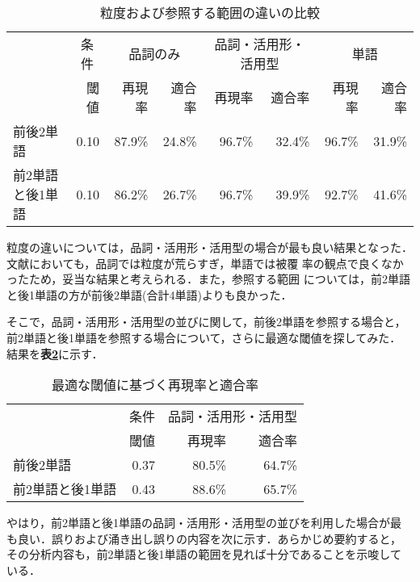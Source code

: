 \begin{table}
\caption{粒度および参照する範囲の違いの比較}\label{t:hikaku}
\begin{center}
\begin{tabular}{|l||r||r|r|r|r|r|r|}
\hline
 & \multicolumn{1}{c||}{条件} 
                 & \multicolumn{2}{c|}{品詞のみ}
                 & \multicolumn{2}{c|}{品詞・活用形・活用型}
                 & \multicolumn{2}{c|}{単語} \\
\cline{2-8}
                 & 閾値 & 再現率 & 適合率 & 再現率 & 適合率 & 再現率 & 適合率 \\
\hline\hline
前後2単語        & 0.10 & 87.9\% & 24.8\% & 96.7\% & 32.4\% & 96.7\% & 31.9\% \\
\hline
前2単語と後1単語 & 0.10 & 86.2\% & 26.7\% & 96.7\% & 39.9\% & 92.7\% & 41.6\% \\
\hline
\end{tabular}
\end{center}
\end{table}

粒度の違いについては，品詞・活用形・活用型の場合が最も良い結果となった．
文献\cite{Takezawa96}においても，品詞では粒度が荒らすぎ，単語では被覆
率の観点で良くなかったため，妥当な結果と考えられる．また，参照する範囲
については，前2単語と後1単語の方が前後2単語(合計4単語)よりも良かった．

そこで，品詞・活用形・活用型の並びに関して，前後2単語を参照する場合と，
前2単語と後1単語を参照する場合について，さらに最適な閾値を探してみた．
結果を{\bf\dg 表\ref{t:result}}に示す．

\begin{table}
\caption{最適な閾値に基づく再現率と適合率}\label{t:result}
\begin{center}
\begin{tabular}{|l||r||r|r|}
\hline
 & \multicolumn{1}{c||}{条件} & \multicolumn{2}{c|}{品詞・活用形・活用型} \\
\cline{2-4}
                 & 閾値 & 再現率 & 適合率 \\
\hline\hline
前後2単語        & 0.37 & 80.5\% & 64.7\% \\
\hline
前2単語と後1単語 & 0.43 & 88.6\% & 65.7\% \\
\hline
\end{tabular}
\end{center}
\end{table}

やはり，前2単語と後1単語の品詞・活用形・活用型の並びを利用した場合が最
も良い．誤りおよび涌き出し誤りの内容を次に示す．あらかじめ要約すると，
その分析内容も，前2単語と後1単語の範囲を見れば十分であることを示唆して
いる．

